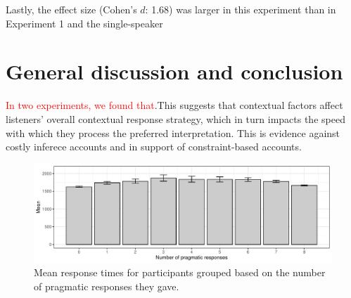 \documentclass[10pt,letterpaper]{article}
\begin{document}
Lastly, the effect size (Cohen's $d$: 1.68) was larger in this experiment than in Experiment 1 and the single-speaker 

\section{General discussion and conclusion}

\textcolor{red}{In two experiments, we found that}.This suggests that contextual factors affect listeners' overall contextual response strategy, which in turn impacts the speed with which they process the preferred interpretation. This is evidence against costly inferece accounts and in support of constraint-based accounts.

\begin{figure}
  \includegraphics[width=\columnwidth]{plots/consistency.pdf}
  \caption{Mean response times for participants grouped based on the number of pragmatic responses they gave. \label{fig:consistency}}
\end{figure}

%
%




\setlength{\bibleftmargin}{.125in}
\setlength{\bibindent}{-\bibleftmargin}


\end{document}
